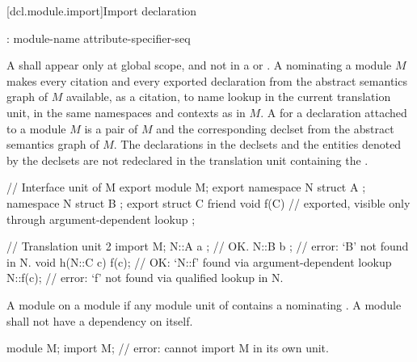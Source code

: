 [dcl.module.import]{Import declaration}%

\begin{std.txt}\color{addclr}
  \begin{bnf}\color{addclr}
    :\br
       module-name attribute-specifier-seq\opt {} \terminal{;}
  \end{bnf}

  \resetalinea[0]
  \alinea
  A  shall appear only at
  global scope, and not in a 
  or .
  A  nominating a module $M$
  makes every citation and every exported declaration from the 
  abstract semantics graph of $M$ available, as a citation,
  to name lookup in
  the current translation unit, in the same namespaces and contexts
  as in $M$.
  A  for a declaration attached to a module $M$ is a pair of
  $M$ and the corresponding declset from the abstract semantics graph 
  of $M$. 
  \enternote
  The declarations in the declsets and the entities denoted by the declsets
  are not redeclared in the translation unit
    containing the .
  \exitnote
  \begin{example}
  \begin{Program}
     // Interface unit of M
     export module M;
     export namespace N {
        struct A { };
     }
     namespace N {
        struct B { };
        export struct C {
           friend void f(C) { }  // exported, visible only through argument-dependent lookup
        };
     }

     // Translation unit 2
     import M;
     N::A a { };                // OK.
     N::B b { };                // error: `B' not found in N.
     void h(N::C c) {
        f(c);                   // OK: `N::f' found via argument-dependent lookup
        N::f(c);                // error: `f' not found via qualified lookup in N.
     }
  \end{Program}
  \end{example}

  \alinea
  A module   on a module 
  if any module unit of  contains a 
  nominating . A module shall not have a dependency on
  itself.
  \begin{example}
  \begin{codeblock}
     module M;
     import M;          // error: cannot import M in its own unit.
  \end{codeblock} 
  \end{example}


\end{std.txt}
